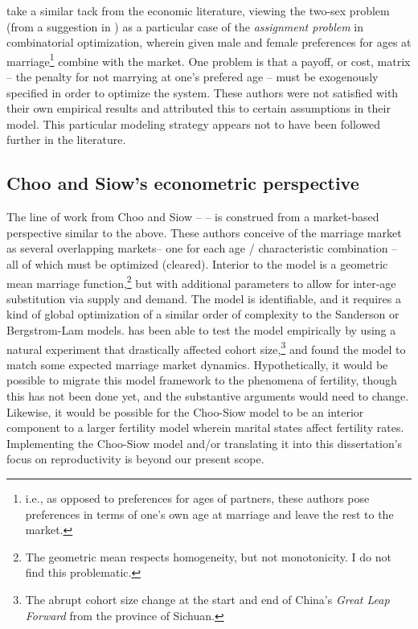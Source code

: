\citet{bergstrom1994sweden} take a similar tack from the economic literature,
viewing the two-sex problem (from a suggestion in \citet{becker1973theory}) as a
particular case of the \textit{assignment problem} in combinatorial optimization, wherein given male
and female preferences for ages at marriage\footnote{i.e., as opposed to
preferences for ages of partners, these authors pose preferences in terms of
one's own age at marriage and leave the rest to the market.} combine with the
market. One problem is that a payoff, or cost, matrix -- the penalty for not
marrying at one's prefered age -- must be exogenously specified in order to
optimize the system. These authors were not satisfied with their own
empirical results and attributed this to certain assumptions in their model.
This particular modeling strategy appears not to have been followed further in
the literature.

\subsection{Choo and Siow's econometric perspective} 
The line of work from Choo
and Siow -- \citep{choo2006estimating, siow2008does, seitz2010collective} -- is
construed from a market-based perspective similar to the above. These
authors conceive of the marriage market as several overlapping markets-- one
for each age / characteristic combination -- all of which must be optimized
(cleared). Interior to the model is a geometric mean marriage
function,\footnote{The geometric mean respects homogeneity, but not
monotonicity. I do not find this problematic.} but with additional
parameters to allow for inter-age substitution via supply and demand. The model
is identifiable, and it requires a kind of global optimization of a similar
order of complexity to the Sanderson or Bergstrom-Lam models. \citet{siow2008does} has
been able to test the model empirically by using a natural experiment that
drastically affected cohort size,\footnote{The abrupt cohort size change at the
start and end of China's \textit{Great Leap Forward} from the province of
Sichuan.} and found the model to match some expected marriage market
dynamics. Hypothetically, it would be possible to migrate this model framework
to the phenomena of fertility, though this has not been done yet, and the
substantive arguments would need to change. Likewise, it would be possible for
the Choo-Siow model to be an interior component to a larger fertility model
wherein marital states affect fertility rates. Implementing the Choo-Siow model
and/or translating it into this dissertation's focus on reproductivity is
beyond our present scope. 

